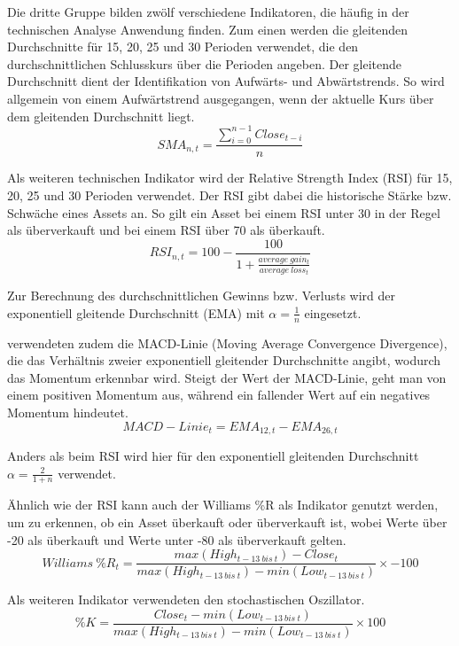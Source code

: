\documentclass[a4paper, 12pt]{article}
\begin{document}
Die dritte Gruppe bilden zwölf verschiedene Indikatoren, die häufig in der technischen Analyse Anwendung finden.
Zum einen werden die gleitenden Durchschnitte für 15, 20, 25 und 30 Perioden verwendet, die den durchschnittlichen Schlusskurs über die Perioden angeben.
Der gleitende Durchschnitt dient der Identifikation von Aufwärts- und Abwärtstrends.
So wird allgemein von einem Aufwärtstrend ausgegangen, wenn der aktuelle Kurs über dem gleitenden Durchschnitt liegt.
\begin{equation}
  SMA_{n, t} = \frac{\sum_{i=0}^{n-1} Close_{t-i}}{n}
\end{equation}

Als weiteren technischen Indikator wird der Relative Strength Index (RSI) für 15, 20, 25 und 30 Perioden verwendet.
Der RSI gibt dabei die historische Stärke bzw. Schwäche eines Assets an.
So gilt ein Asset bei einem RSI unter 30 in der Regel als überverkauft und bei einem RSI über 70 als überkauft.
\begin{equation}
	RSI_{n,t} = 100 - \frac{100}{1 + \frac{average\ gain_t}{average\ loss_t}}
\end{equation}

Zur Berechnung des durchschnittlichen Gewinns bzw. Verlusts wird der exponentiell gleitende Durchschnitt (EMA) mit $\alpha=\frac{1}{n}$ eingesetzt.

\citeauthor{Goutte2023} verwendeten zudem die MACD-Linie (Moving Average Convergence Divergence), die das Verhältnis zweier exponentiell gleitender Durchschnitte angibt, wodurch das Momentum erkennbar wird.
Steigt der Wert der MACD-Linie, geht man von einem positiven Momentum aus, während ein fallender Wert auf ein negatives Momentum hindeutet.
\begin{equation}
  MACD-Linie_t = EMA_{12, t} - EMA_{26, t}
\end{equation}

Anders als beim RSI wird hier für den exponentiell gleitenden Durchschnitt $\alpha=\frac{2}{1 + n}$ verwendet.

Ähnlich wie der RSI kann auch der Williams \%R als Indikator genutzt werden, um zu erkennen, ob ein Asset überkauft oder überverkauft ist, wobei Werte über -20 als überkauft und Werte unter -80 als überverkauft gelten.
\begin{equation}
	Williams\ \%R_t = \frac{max(High_{t-13\ bis\ t})-Close_t}{max(High_{t-13\ bis\ t}) - min(Low_{t-13\ bis\ t})} \times -100
\end{equation}

Als weiteren Indikator verwendeten \textcite{Goutte2023} den stochastischen Oszillator.
\begin{equation}
  \%K = \frac{Close_t - min(Low_{t-13\ bis\ t})}{max(High_{t-13\ bis\ t}) - min(Low_{t-13\ bis\ t})} \times 100
\end{equation}
\end{document}
